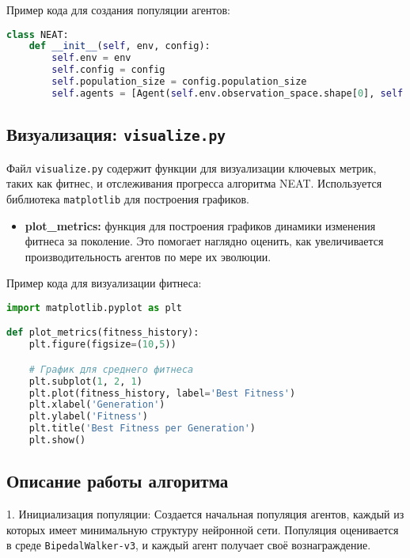 \documentclass[a4paper,12pt]{article}
\begin{document}
Пример кода для создания популяции агентов:

\begin{lstlisting}[language=Python]
class NEAT:
    def __init__(self, env, config):
        self.env = env
        self.config = config
        self.population_size = config.population_size
        self.agents = [Agent(self.env.observation_space.shape[0], self.env.action_space.shape[0]) for _ in range(self.population_size)]
\end{lstlisting}

\subsection{Визуализация: \texttt{visualize.py}}

Файл \texttt{visualize.py} содержит функции для визуализации ключевых метрик, таких как фитнес, и отслеживания прогресса алгоритма NEAT. Используется библиотека \texttt{matplotlib} для построения графиков.

\begin{itemize}
    \item \textbf{plot\_metrics:} функция для построения графиков динамики изменения фитнеса за поколение. Это помогает наглядно оценить, как увеличивается производительность агентов по мере их эволюции.
\end{itemize}

Пример кода для визуализации фитнеса:

\begin{lstlisting}[language=Python]
import matplotlib.pyplot as plt

def plot_metrics(fitness_history):
    plt.figure(figsize=(10,5))

    # График для среднего фитнеса
    plt.subplot(1, 2, 1)
    plt.plot(fitness_history, label='Best Fitness')
    plt.xlabel('Generation')
    plt.ylabel('Fitness')
    plt.title('Best Fitness per Generation')
    plt.show()
\end{lstlisting}

\subsection{Описание работы алгоритма}

1. Инициализация популяции: Создается начальная популяция агентов, каждый из которых имеет минимальную структуру нейронной сети. Популяция оценивается в среде \texttt{BipedalWalker-v3}, и каждый агент получает своё вознаграждение.
\end{document}
